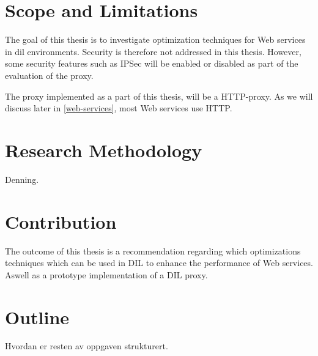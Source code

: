 \section{Scope and Limitations}

The goal of this thesis is to investigate optimization techniques for Web
services in dil environments. Security is therefore not addressed in this
thesis. However, some security features such as IPSec will be enabled or
disabled as part of the evaluation of the proxy.

The proxy implemented as a part of this thesis, will be a HTTP-proxy. As we
will discuss later in \cref{web-services}, most Web services use HTTP.

\section{Research Methodology}
Denning.


\section{Contribution}

The outcome of this thesis is a recommendation regarding which optimizations
techniques which can be used in DIL to enhance the performance of Web services.
Aswell as a prototype implementation of a DIL proxy.

\section{Outline}
Hvordan er resten av oppgaven strukturert.
